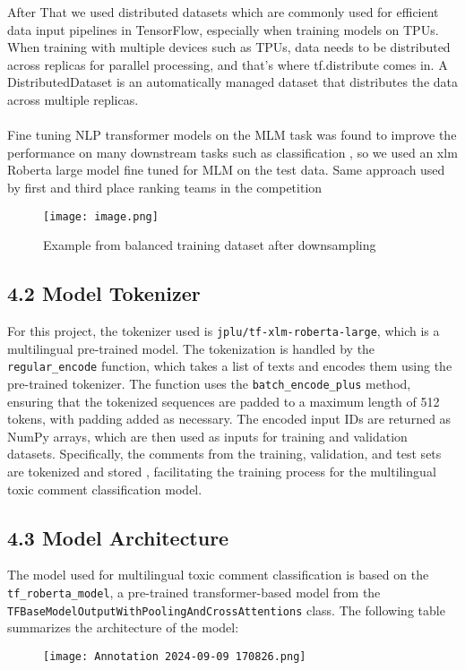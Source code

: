 \documentclass{article}
\begin{document}
After That we used distributed datasets which are commonly used for efficient data input pipelines in TensorFlow, especially when training models on TPUs. When training with multiple devices such as TPUs, data needs to be distributed across replicas for parallel processing, and that’s where tf.distribute comes in. A DistributedDataset is an automatically managed dataset that distributes the data across multiple replicas. 
\\
\\
Fine tuning NLP transformer models on the MLM task was found to  improve the performance  on many downstream tasks such as classification , so we used an xlm Roberta large model fine tuned for MLM on the test data.
 Same approach used by first and third place ranking  teams in the competition




\begin{figure}[H]
    \centering
    \texttt{[image: image.png]}
    \caption{Example from balanced training dataset after downsampling}
    \label{fig:enter-label}
\end{figure}
\subsection*{4.2 Model Tokenizer}
For this project, the tokenizer used is \texttt{jplu/tf-xlm-roberta-large}, which is a multilingual pre-trained model. The tokenization is handled by the \texttt{regular\_encode} function, which takes a list of texts and encodes them using the pre-trained tokenizer. The function uses the \texttt{batch\_encode\_plus} method, ensuring that the tokenized sequences are padded to a maximum length of 512 tokens, with padding added as necessary. The encoded input IDs are returned as NumPy arrays, which are then used as inputs for training and validation datasets. Specifically, the comments from the training, validation, and test sets are tokenized and stored , facilitating the training process for the multilingual toxic comment classification model.

\subsection*{4.3 Model Architecture}

The model used for multilingual toxic comment classification is based on the \texttt{tf\_roberta\_model}, a pre-trained transformer-based model from the\\ \texttt{TFBaseModelOutputWithPoolingAndCrossAttentions} class. The following table summarizes the architecture of the model:
\begin{figure}[H]
    \centering
    \texttt{[image: Annotation 2024-09-09 170826.png]}
\end{figure}
\end{document}

